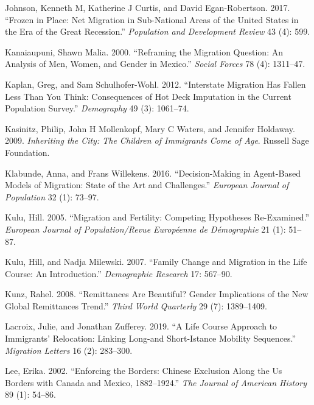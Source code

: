 \documentclass[
]{article}
\begin{document}
\leavevmode\hypertarget{ref-johnson2017frozen}{}%
Johnson, Kenneth M, Katherine J Curtis, and David Egan-Robertson. 2017.
``Frozen in Place: Net Migration in Sub-National Areas of the United
States in the Era of the Great Recession.'' \emph{Population and
Development Review} 43 (4): 599.

\leavevmode\hypertarget{ref-kanaiaupuni2000reframing}{}%
Kanaiaupuni, Shawn Malia. 2000. ``Reframing the Migration Question: An
Analysis of Men, Women, and Gender in Mexico.'' \emph{Social Forces} 78
(4): 1311--47.

\leavevmode\hypertarget{ref-kaplan2012interstate}{}%
Kaplan, Greg, and Sam Schulhofer-Wohl. 2012. ``Interstate Migration Has
Fallen Less Than You Think: Consequences of Hot Deck Imputation in the
Current Population Survey.'' \emph{Demography} 49 (3): 1061--74.

\leavevmode\hypertarget{ref-kasinitz2009inheriting}{}%
Kasinitz, Philip, John H Mollenkopf, Mary C Waters, and Jennifer
Holdaway. 2009. \emph{Inheriting the City: The Children of Immigrants
Come of Age}. Russell Sage Foundation.

\leavevmode\hypertarget{ref-klabunde2016decision}{}%
Klabunde, Anna, and Frans Willekens. 2016. ``Decision-Making in
Agent-Based Models of Migration: State of the Art and Challenges.''
\emph{European Journal of Population} 32 (1): 73--97.

\leavevmode\hypertarget{ref-kulu2005migration}{}%
Kulu, Hill. 2005. ``Migration and Fertility: Competing Hypotheses
Re-Examined.'' \emph{European Journal of Population/Revue Européenne de
Démographie} 21 (1): 51--87.

\leavevmode\hypertarget{ref-kulu2007family}{}%
Kulu, Hill, and Nadja Milewski. 2007. ``Family Change and Migration in
the Life Course: An Introduction.'' \emph{Demographic Research} 17:
567--90.

\leavevmode\hypertarget{ref-kunz2008remittances}{}%
Kunz, Rahel. 2008. ``Remittances Are Beautiful? Gender Implications of
the New Global Remittances Trend.'' \emph{Third World Quarterly} 29 (7):
1389--1409.

\leavevmode\hypertarget{ref-lacroix2019life}{}%
Lacroix, Julie, and Jonathan Zufferey. 2019. ``A Life Course Approach to
Immigrants' Relocation: Linking Long-and Short-Istance Mobility
Sequences.'' \emph{Migration Letters} 16 (2): 283--300.

\leavevmode\hypertarget{ref-lee2002enforcing}{}%
Lee, Erika. 2002. ``Enforcing the Borders: Chinese Exclusion Along the
Us Borders with Canada and Mexico, 1882--1924.'' \emph{The Journal of
American History} 89 (1): 54--86.
\end{document}
